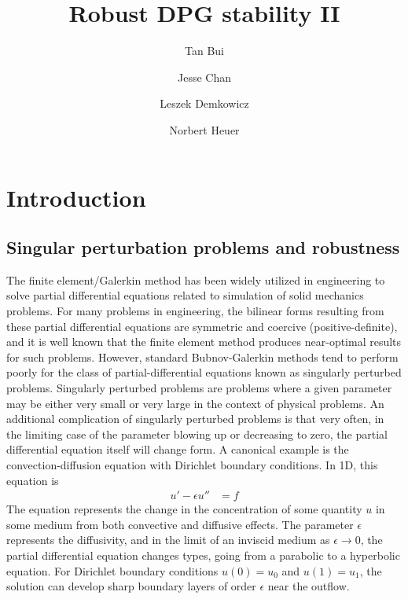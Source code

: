 \documentclass[11pt,onecolumn]{scrartcl}
\author{Tan Bui \and Jesse Chan \and Leszek Demkowicz \and Norbert Heuer}
\title{Robust DPG stability II}
\date{}
\begin{document}
\tableofcontents
\maketitle

\section{Introduction}

\subsection{Singular perturbation problems and robustness}

The finite element/Galerkin method has been widely utilized in engineering to solve partial differential equations related to simulation of solid mechanics problems. For many problems in engineering, the bilinear forms resulting from these partial differential equations are symmetric and coercive (positive-definite), and it is well known that the finite element method produces near-optimal results for such problems. However, standard Bubnov-Galerkin methods tend to perform poorly for the class of partial-differential equations known as singularly perturbed problems. Singularly perturbed problems are problems where a given parameter may be either very small or very large in the context of physical problems.  An additional complication of singularly perturbed problems is that very often, in the limiting case of the parameter blowing up or decreasing to zero, the partial differential equation itself will change form. A canonical example is the convection-diffusion equation with Dirichlet boundary conditions. In 1D, this equation is
\begin{align*}
u'-\epsilon u'' &= f
\end{align*}
The equation represents the change in the concentration of some quantity $u$ in some medium from both convective and diffusive effects. The parameter $\epsilon$ represents the diffusivity, and in the limit of an inviscid medium as $\epsilon\rightarrow 0$, the partial differential equation changes types, going from a parabolic to a hyperbolic equation. For Dirichlet boundary conditions $u(0)=u_0$ and $u(1)= u_1$, the solution can develop sharp boundary layers of order $\epsilon$ near the outflow. 
\end{document}
